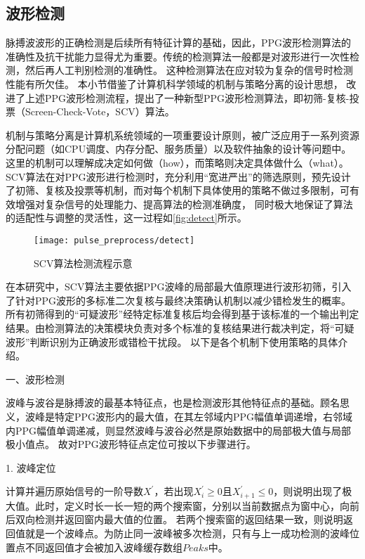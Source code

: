 \subsection{波形检测}
脉搏波波形的正确检测是后续所有特征计算的基础，因此，PPG波形检测算法的准确性及抗干扰能力显得尤为重要。传统的检测算法一般都是对波形进行一次性检测，然后再人工判别检测的准确性。
这种检测算法在应对较为复杂的信号时检测性能有所欠佳。
本小节借鉴了计算机科学领域的机制与策略分离的设计思想，
改进了上述PPG波形检测流程，提出了一种新型PPG波形检测算法，即初筛-复核-投票（Screen-Check-Vote，SCV）算法。

机制与策略分离是计算机系统领域的一项重要设计原则，被广泛应用于一系列资源分配问题（如CPU调度、内存分配、服务质量）以及软件抽象的设计等问题中\cite{Wulf1974,Levin1975,Brinch2001}。
这里的机制可以理解成决定如何做（how），而策略则决定具体做什么（what）。
SCV算法在对PPG波形进行检测时，充分利用“宽进严出”的筛选原则，预先设计了初筛、复核及投票等机制，而对每个机制下具体使用的策略不做过多限制，可有效增强对复杂信号的处理能力、提高算法的检测准确度，
同时极大地保证了算法的适配性与调整的灵活性，这一过程如\autoref{fig:detect}所示。
\begin{figure}[htbp]
    \centering
    \texttt{[image: pulse\_preprocess/detect]}
    \caption{\label{fig:detect}SCV算法检测流程示意}
\end{figure}

在本研究中，SCV算法主要依据PPG波峰的局部最大值原理进行波形初筛，引入了针对PPG波形的多标准二次复核与最终决策确认机制以减少错检发生的概率。
所有初筛得到的“可疑波形”经特定标准复核后均会得到基于该标准的一个输出判定结果。由检测算法的决策模块负责对多个标准的复核结果进行裁决判定，将“可疑波形”判断识别为正确波形或错检干扰段。
以下是各个机制下使用策略的具体介绍。

一、波形检测

波峰与波谷是脉搏波的最基本特征点，也是检测波形其他特征点的基础。顾名思义，波峰是特定PPG波形内的最大值，在其左邻域内PPG幅值单调递增，右邻域内PPG幅值单调递减，则显然波峰与波谷必然是原始数据中的局部极大值与局部极小值点。
故对PPG波形特征点定位可按以下步骤进行。

1. 波峰定位

计算并遍历原始信号的一阶导数$X^{'}$，若出现$X_i^{'}\ge 0$且$X_{i+1}^{'}\le 0$，则说明出现了极大值。此时，定义时长一长一短的两个搜索窗，分别以当前数据点为窗中心，向前后双向检测并返回窗内最大值的位置。
若两个搜索窗的返回结果一致，则说明返回值就是一个波峰点。为防止同一波峰被多次检测，只有与上一成功检测的波峰位置点不同返回值才会被加入波峰缓存数组$Peaks$中。

